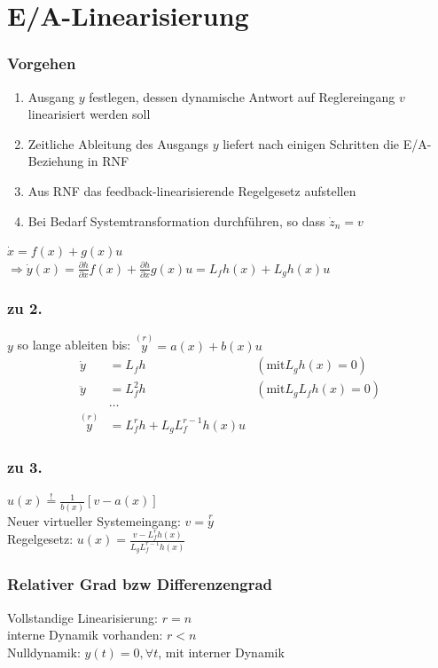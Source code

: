 \documentclass[german]{latex4ei/latex4ei_sheet}
\begin{document}
\section{E/A-Linearisierung}
\begin{sectionbox}
\subsubsection{Vorgehen}
\begin{enumerate}
  \item Ausgang $y$ festlegen, dessen dynamische Antwort auf Reglereingang $v$ linearisiert werden soll
  \item Zeitliche Ableitung des Ausgangs $y$ liefert nach einigen Schritten  die E/A-Beziehung in RNF
  \item Aus RNF das feedback-linearisierende Regelgesetz aufstellen
  \item Bei Bedarf Systemtransformation durchführen, so dass $\dot{z}_n = v$
\end{enumerate}

$\dot{x} = f(x) + g(x)u$ \\
$\Rightarrow \dot{y}(x) = \frac{\partial h}{\partial x}f(x) + \frac{\partial h}{\partial x}g(x)u = L_f h(x) + L_g h(x) u$ \\

\subsubsection{zu 2.}
$y$ so lange ableiten bis: $\overset{(r)}{y} = a(x) + b(x) u$ \\
\begin{align*}
  \dot{y}           &= L_f h                            &(\text{mit} L_g h(x) = 0) \\
  \ddot{y}          &= L_f^2 h                          &(\text{mit} L_g L_f h(x) = 0) \\
                    &\dots                              & \\
  \overset{(r)}{y}  &= L_f^r h + L_g L_f^{r-1} h(x) u   &
\end{align*}

\subsubsection{zu 3.}
$u(x) \overset{!}{=} \frac{1}{b(x)} [v - a(x)]$ \\
Neuer virtueller Systemeingang: $v = \overset{r}{y}$ \\
Regelgesetz: $u(x) = \frac{v - L_f^r h(x)}{L_g L_f^{r-1} h(x)}$

\subsubsection{Relativer Grad bzw Differenzengrad}
Vollstandige Linearisierung: $r = n$ \\
interne Dynamik vorhanden: $r < n$ \\
Nulldynamik: $y(t) = 0, \forall t$, mit interner Dynamik
\end{sectionbox}
\end{document}
